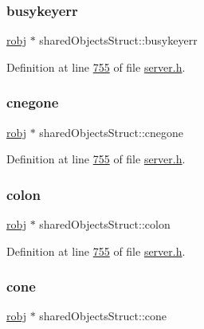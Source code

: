 \subsubsection{\texorpdfstring{busykeyerr}{busykeyerr}}
{\footnotesize\ttfamily \hyperlink{structredisObject}{robj} $\ast$ shared\+Objects\+Struct\+::busykeyerr}



Definition at line \hyperlink{server_8h_source_l00755}{755} of file \hyperlink{server_8h_source}{server.\+h}.

\mbox{\label{structsharedObjectsStruct_aa6ea0e09bf533e1918192c3bc3b9073f}} 
\subsubsection{\texorpdfstring{cnegone}{cnegone}}
{\footnotesize\ttfamily \hyperlink{structredisObject}{robj} $\ast$ shared\+Objects\+Struct\+::cnegone}



Definition at line \hyperlink{server_8h_source_l00755}{755} of file \hyperlink{server_8h_source}{server.\+h}.

\mbox{\label{structsharedObjectsStruct_a246d61c7f3ed42908db171f916426a1b}} 
\subsubsection{\texorpdfstring{colon}{colon}}
{\footnotesize\ttfamily \hyperlink{structredisObject}{robj} $\ast$ shared\+Objects\+Struct\+::colon}



Definition at line \hyperlink{server_8h_source_l00755}{755} of file \hyperlink{server_8h_source}{server.\+h}.

\mbox{\label{structsharedObjectsStruct_aa7c0627c0d11f10f8640df3834ec51cb}} 
\subsubsection{\texorpdfstring{cone}{cone}}
{\footnotesize\ttfamily \hyperlink{structredisObject}{robj} $\ast$ shared\+Objects\+Struct\+::cone}



